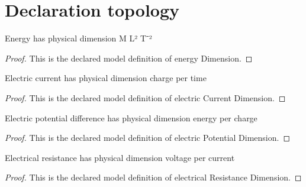\section{Declaration topology}
\begin{definition}
  \label{def:physics:phyx-mini-0941:phyxminiproblems-problemphyxmini0941-energydimension}
  Energy has physical dimension M L² T⁻²
\end{definition}
\begin{proof}
  This is the declared model definition of energy Dimension.
\end{proof}
\begin{definition}
  \label{def:physics:phyx-mini-0941:phyxminiproblems-problemphyxmini0941-electriccurrentdimension}
  Electric current has physical dimension charge per time
\end{definition}
\begin{proof}
  This is the declared model definition of electric Current Dimension.
\end{proof}
\begin{definition}
  \label{def:physics:phyx-mini-0941:phyxminiproblems-problemphyxmini0941-electricpotentialdimension}
  Electric potential difference has physical dimension energy per charge
\end{definition}
\begin{proof}
  This is the declared model definition of electric Potential Dimension.
\end{proof}
\begin{definition}
  \label{def:physics:phyx-mini-0941:phyxminiproblems-problemphyxmini0941-electricalresistancedimension}
  Electrical resistance has physical dimension voltage per current
\end{definition}
\begin{proof}
  This is the declared model definition of electrical Resistance Dimension.
\end{proof}
